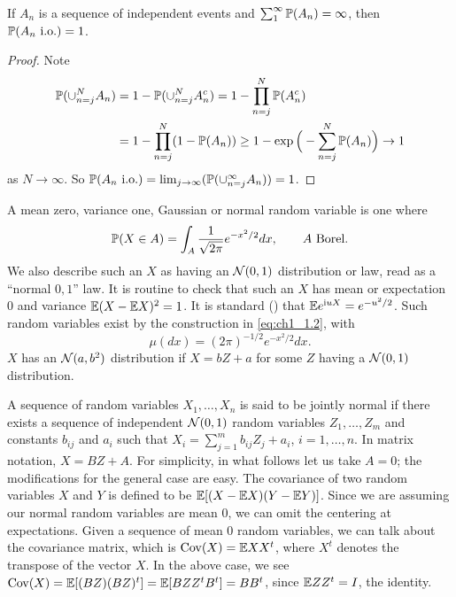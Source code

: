 \begin{proposition}\label{prop:ch1_1.8}
If $A_n$ is a sequence of independent events and $\sum_1^\infty \P(A_n) \allowbreak= \infty$, then $\P(A_n~\textnormal{i.o.}) = 1$.
\end{proposition}

\begin{proof}
Note
\begin{align*}
    \P(\cup_{n=j}^N A_n) &= 1 - \P(\cup_{n=j}^N A_n^c) = 1 - \prod_{n=j}^N \P(A_n^c) \\
    &= 1 - \prod_{n=j}^N (1 - \P(A_n)) \geq 1 - \exp\Big(-\sum_{n=j}^N \P(A_n)\Big) \to 1
\end{align*}
as $N \to \infty$. So $\P(A_n~\text{i.o.}) = \lim_{j\to\infty}(\P(\cup_{n=j}^\infty A_n)) = 1$.
\end{proof}


A mean zero, variance one, Gaussian or normal random variable is one where
\begin{equation}\label{eq:ch1_1.5}
    \P(X \in A) = \int_A \frac{1}{\sqrt{2\pi}}e^{-x^2/2}dx, \qquad A~\text{Borel}.
\end{equation}
We also describe such an $X$ as having an $\NC(0,1)$ distribution or law, read as a ``normal $0,1$'' law. It is routine to check that such an $X$ has mean or expectation $0$ and variance $\E(X - \E X)^2 = 1$. It is standard (\cite[see][pp.~66-67]{Durrett1991}) that $\E e^{\im uX} = e^{-u^2/2}$. Such random variables exist by the construction in \eqref{eq:ch1_1.2}, with
\[
    \mu(dx) = (2\pi)^{-1/2}e^{-x^2/2}dx.
\]
$X$ has an $\NC(a,b^2)$ distribution if $X = bZ + a$ for some $Z$ having a $\NC(0,1)$ distribution.

A sequence of random variables $X_1,\ldots,X_n$ is said to be jointly normal if there exists a sequence of independent $\NC(0,1)$ random variables $Z_1,\ldots,Z_m$ and constants $b_{ij}$ and $a_i$ such that $X_i = \sum_{j=1}^m b_{ij}Z_j + a_i$, $i = 1,\ldots,n$. In matrix notation, $X = BZ + A$. For simplicity, in what follows let us take $A = 0$; the modifications for the general case are easy. The covariance of two random variables $X$ and $Y$ is defined to be $\E[(X-\E X)(Y-\E Y)]$. Since we are assuming our normal random variables are mean $0$, we can omit the centering at expectations. Given a sequence of mean $0$ random variables, we can talk about the covariance matrix, which is $\Cov(X) = \E XX^t$, where $X^t$ denotes the transpose of the vector $X$. In the above case, we see $\Cov(X) = \E[(BZ)(BZ)^t] = \E[BZZ^tB^t] = BB^t$, since $\E ZZ^t = I$, the identity.

